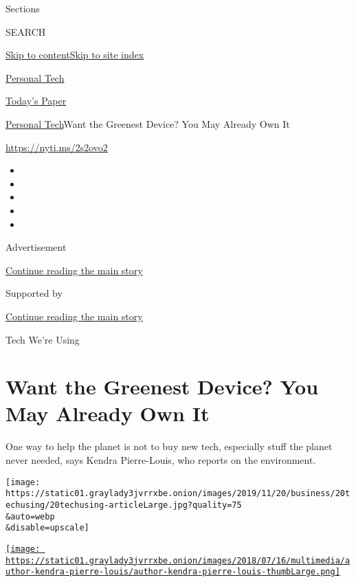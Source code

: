 Sections

SEARCH

\protect\hyperlink{site-content}{Skip to
content}\protect\hyperlink{site-index}{Skip to site index}

\href{https://www.nytimes3xbfgragh.onion/section/technology/personaltech}{Personal
Tech}

\href{https://myaccount.nytimes3xbfgragh.onion/auth/login?response_type=cookie\&client_id=vi}{}

\href{https://www.nytimes3xbfgragh.onion/section/todayspaper}{Today's
Paper}

\href{/section/technology/personaltech}{Personal Tech}\textbar{}Want the
Greenest Device? You May Already Own It

\href{https://nyti.ms/2s2ovo2}{https://nyti.ms/2s2ovo2}

\begin{itemize}
\item
\item
\item
\item
\item
\end{itemize}

Advertisement

\protect\hyperlink{after-top}{Continue reading the main story}

Supported by

\protect\hyperlink{after-sponsor}{Continue reading the main story}

Tech We're Using

\hypertarget{want-the-greenest-device-you-may-already-own-it}{%
\section{Want the Greenest Device? You May Already Own
It}\label{want-the-greenest-device-you-may-already-own-it}}

One way to help the planet is not to buy new tech, especially stuff the
planet never needed, says Kendra Pierre-Louis, who reports on the
environment.

\texttt{[image: https://static01.graylady3jvrrxbe.onion/images/2019/11/20/business/20techusing/20techusing-articleLarge.jpg?quality=75\\\&auto=webp\\\&disable=upscale]}

\href{https://www.nytimes3xbfgragh.onion/by/kendra-pierre-louis}{\texttt{[image: https://static01.graylady3jvrrxbe.onion/images/2018/07/16/multimedia/author-kendra-pierre-louis/author-kendra-pierre-louis-thumbLarge.png]}}

